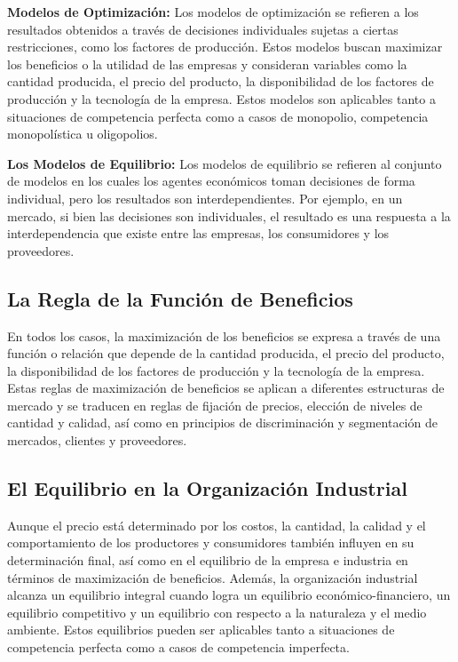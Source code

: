\documentclass[
  doc,
  floatsintext,
  longtable,
  a4paper,
  nolmodern,
  notxfonts,
  notimes,
  12pt,
  colorlinks=true,linkcolor=blue,citecolor=blue,urlcolor=blue]{apa7}
\begin{document}
\textbf{Modelos de Optimización:} Los modelos de optimización se
refieren a los resultados obtenidos a través de decisiones individuales
sujetas a ciertas restricciones, como los factores de producción. Estos
modelos buscan maximizar los beneficios o la utilidad de las empresas y
consideran variables como la cantidad producida, el precio del producto,
la disponibilidad de los factores de producción y la tecnología de la
empresa. Estos modelos son aplicables tanto a situaciones de competencia
perfecta como a casos de monopolio, competencia monopolística u
oligopolios.

\textbf{Los Modelos de Equilibrio:} Los modelos de equilibrio se
refieren al conjunto de modelos en los cuales los agentes económicos
toman decisiones de forma individual, pero los resultados son
interdependientes. Por ejemplo, en un mercado, si bien las decisiones
son individuales, el resultado es una respuesta a la interdependencia
que existe entre las empresas, los consumidores y los proveedores.

\subsection{La Regla de la Función de
Beneficios}\label{la-regla-de-la-funciuxf3n-de-beneficios}

En todos los casos, la maximización de los beneficios se expresa a
través de una función o relación que depende de la cantidad producida,
el precio del producto, la disponibilidad de los factores de producción
y la tecnología de la empresa. Estas reglas de maximización de
beneficios se aplican a diferentes estructuras de mercado y se traducen
en reglas de fijación de precios, elección de niveles de cantidad y
calidad, así como en principios de discriminación y segmentación de
mercados, clientes y proveedores.

\subsection{El Equilibrio en la Organización
Industrial}\label{el-equilibrio-en-la-organizaciuxf3n-industrial}

Aunque el precio está determinado por los costos, la cantidad, la
calidad y el comportamiento de los productores y consumidores también
influyen en su determinación final, así como en el equilibrio de la
empresa e industria en términos de maximización de beneficios. Además,
la organización industrial alcanza un equilibrio integral cuando logra
un equilibrio económico-financiero, un equilibrio competitivo y un
equilibrio con respecto a la naturaleza y el medio ambiente. Estos
equilibrios pueden ser aplicables tanto a situaciones de competencia
perfecta como a casos de competencia imperfecta.
\end{document}
